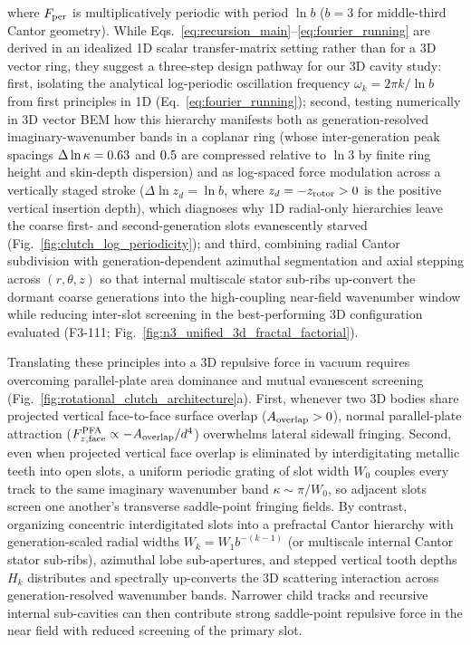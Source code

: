 \documentclass[pdflatex,sn-nature]{sn-jnl}
\DeclareRobustCommand{\roundtwo}[1]{\fpeval{round(#1,2)}}
\begin{document}
where $F_{\rm per}$ is multiplicatively periodic with period $\ln b$ ($b=3$ for middle-third Cantor geometry). While Eqs.~\eqref{eq:recursion_main}--\eqref{eq:fourier_running} are derived in an idealized 1D scalar transfer-matrix setting rather than for a 3D vector ring, they suggest a three-step design pathway for our 3D cavity study: first, isolating the analytical log-periodic oscillation frequency $\omega_k = 2\pi k/\ln b$ from first principles in 1D (Eq.~\ref{eq:fourier_running}); second, testing numerically in 3D vector BEM how this hierarchy manifests both as generation-resolved imaginary-wavenumber bands in a coplanar ring (whose inter-generation peak spacings $\Delta\ln\kappa = \roundtwo{\LogperDlnkTwoone}$ and $\roundtwo{\LogperDlnkThreetwo}$ are compressed relative to $\ln 3$ by finite ring height and skin-depth dispersion) and as log-spaced force modulation across a vertically staged stroke ($\Delta\ln z_d = \ln b$, where $z_d = -z_{\rm rotor} > 0$ is the positive vertical insertion depth), which diagnoses why 1D radial-only hierarchies leave the coarse first- and second-generation slots evanescently starved (Fig.~\ref{fig:clutch_log_periodicity}); and third, combining radial Cantor subdivision with generation-dependent azimuthal segmentation and axial stepping across $(r, \theta, z)$ so that internal multiscale stator sub-ribs up-convert the dormant coarse generations into the high-coupling near-field wavenumber window while reducing inter-slot screening in the best-performing 3D configuration evaluated (F3-111; Fig.~\ref{fig:n3_unified_3d_fractal_factorial}).

Translating these principles into a 3D repulsive force in vacuum requires overcoming parallel-plate area dominance and mutual evanescent screening (Fig.~\ref{fig:rotational_clutch_architecture}a). First, whenever two 3D bodies share projected vertical face-to-face surface overlap ($A_{\rm overlap} > 0$), normal parallel-plate attraction ($F_{z,\rm face}^{\rm PFA} \propto -A_{\rm overlap}/d^4$) overwhelms lateral sidewall fringing. Second, even when projected vertical face overlap is eliminated by interdigitating metallic teeth into open slots\cite{levin2010}, a uniform periodic grating of slot width $W_0$ couples every track to the same imaginary wavenumber band $\kappa \sim \pi/W_0$, so adjacent slots screen one another's transverse saddle-point fringing fields. By contrast, organizing concentric interdigitated slots into a prefractal Cantor hierarchy with generation-scaled radial widths $W_k = W_1 b^{-(k-1)}$ (or multiscale internal Cantor stator sub-ribs), azimuthal lobe sub-apertures, and stepped vertical tooth depths $H_k$ distributes and spectrally up-converts the 3D scattering interaction across generation-resolved wavenumber bands. Narrower child tracks and recursive internal sub-cavities can then contribute strong saddle-point repulsive force in the near field with reduced screening of the primary slot.
\end{document}
